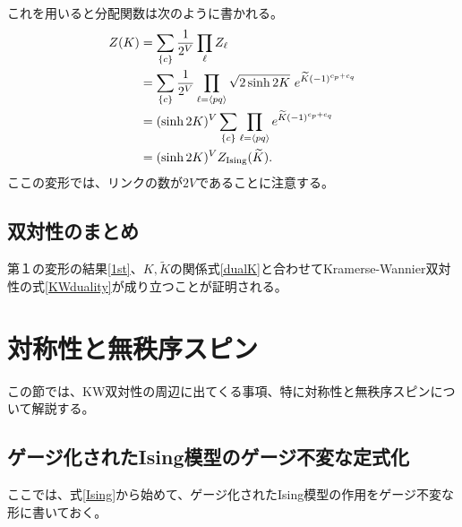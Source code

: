 \documentclass[a4paper,12pt,dvipdfmx]{jlreq}
\newcommand{\Kt}{\widetilde{K}}
\newcommand{\ZIs}{Z_{\mathrm{Ising}}}
\begin{document}
これを用いると分配関数は次のように書かれる。
\begin{align}
  Z(K)&=\sum_{\{c\}}\frac{1}{2^V}\prod_{\ell}Z_{\ell}\notag\\
  &=\sum_{\{c\}}\frac{1}{2^V}\prod_{\ell=\expval{pq}}\sqrt{2\sinh 2K}\ e^{\Kt(-1)^{c_p+c_q}}\notag\\
  &=(\sinh 2K)^{V}\sum_{\{c\}}\prod_{\ell=\expval{pq}} e^{\Kt(-1)^{c_p+c_q}}\notag\\
  &=(\sinh 2K)^{V}\ZIs(\Kt).
\end{align}
ここの変形では、リンクの数が$2V$であることに注意する。

\subsection{双対性のまとめ}

第１の変形の結果\eqref{1st}、$K,\Kt$の関係式\eqref{dualK}と合わせてKramerse-Wannier双対性の式\eqref{KWduality}が成り立つことが証明される。

\section{対称性と無秩序スピン}

この節では、KW双対性の周辺に出てくる事項、特に対称性と無秩序スピンについて解説する。

\subsection{ゲージ化されたIsing模型のゲージ不変な定式化}

ここでは、式\eqref{Ising}から始めて、ゲージ化されたIsing模型の作用をゲージ不変な形に書いておく。
\end{document}
